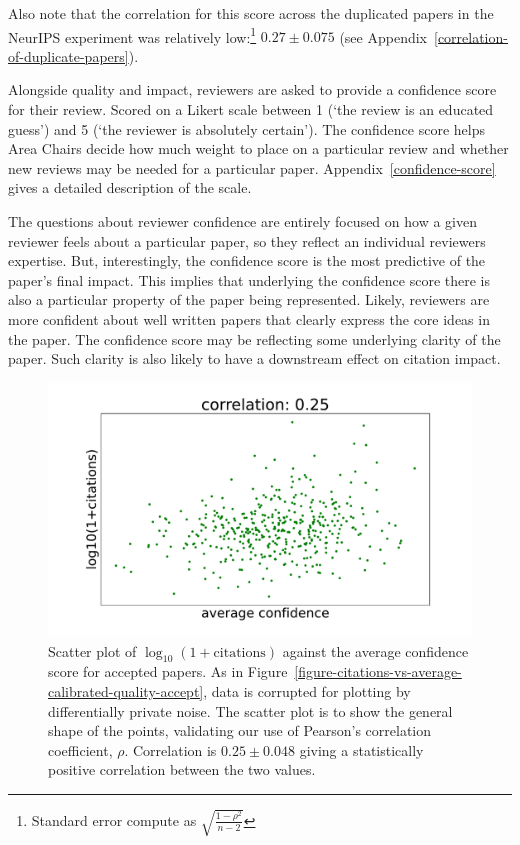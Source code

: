 \documentclass[twoside]{article}
\begin{document}
Also note that the correlation for this score across the duplicated
papers in the NeurIPS experiment was relatively low:\footnote{Standard
  error compute as $\sqrt{\frac{1-\rho^2}{n-2}}$} $0.27 \pm 0.075$
(see Appendix~\ref{correlation-of-duplicate-papers}).

Alongside quality and impact, reviewers are asked to provide a
confidence score for their review. Scored on a Likert scale between 1
(`the review is an educated guess') and 5 (`the reviewer is absolutely
certain'). The confidence score helps Area Chairs decide how much
weight to place on a particular review and whether new reviews may be
needed for a particular paper. Appendix~\ref{confidence-score} gives a
detailed description of the scale.

The questions about reviewer confidence are entirely focused on how a
given reviewer feels about a particular paper, so they reflect an
individual reviewers expertise. But, interestingly, the confidence
score is the most predictive of the paper's final impact. This implies
that underlying the confidence score there is also a particular
property of the paper being represented. Likely, reviewers are more
confident about well written papers that clearly express the core
ideas in the paper. The confidence score may be reflecting some
underlying clarity of the paper. Such clarity is also likely to have a
downstream effect on citation impact.

\begin{figure}[htb]
\includegraphics[width=0.9\columnwidth]{diagrams/neurips/citations-vs-average-confidence-accept.pdf}

\caption{Scatter plot of $\log_{10}(1+\text{citations})$ against the
  average confidence score for accepted papers. As in Figure~\ref{figure-citations-vs-average-calibrated-quality-accept}, data is
  corrupted for plotting by differentially private noise. The scatter
  plot is to show the general shape of the points, validating our use
  of Pearson's correlation coefficient, $\rho$. Correlation is $0.25
  \pm 0.048$ giving a statistically positive correlation between the
  two values.}
\label{figure-citations-vs-average-confidence-accept}
\end{figure}
\end{document}
